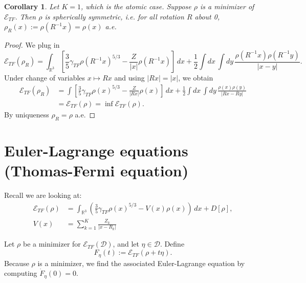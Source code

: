 \documentclass[11pt]{amsart}
\newcommand{\R}{\mathbb{R}}
\newtheorem{cor}{Corollary}
\theoremstyle{definition}
\theoremstyle{definition}
\theoremstyle{definition}
\numberwithin{equation}{section}
\begin{document}
\begin{cor}
Let $K=1$, which is the atomic case. Suppose $\rho$ is a minimizer of $\mathcal{E}_{TF}$. Then $\rho$ is spherically symmetric, i.e. for all rotation $R$ about 0, $\rho_R(x):=\rho(R^{-1}x)=\rho(x)$ a.e.
\end{cor}
\begin{proof}
We plug in
\[
\mathcal{E}_{TF}(\rho_R)=\int_{\R^3}\left[\frac{3}{5}\gamma_{TF}\rho(R^{-1}x)^{5/3}-\frac{Z}{|x|}\rho(R^{-1}x)\right]\,dx+\frac{1}{2}\int dx\,\int dy\,\frac{\rho(R^{-1}x)\rho(R^{-1}y)}{|x-y|}.
\]
Under change of variables $x\mapsto Rx$ and using $|Rx|=|x|$, we obtain
\begin{align*}
\mathcal{E}_{TF}(\rho_R)&=\int\left[\frac{3}{5}\gamma_{TF}\rho(x)^{5/3}-\frac{Z}{|Rx|}\rho(x)\right]\,dx+\frac{1}{2}\int dx\,\int dy\,\frac{\rho(x)\rho(y)}{|Rx-Ry|}\\
&=\mathcal{E}_{TF}(\rho)=\inf\mathcal{E}_{TF}(\rho).
\end{align*}
By uniqueness $\rho_R=\rho$ a.e.
\end{proof}

\section{Euler-Lagrange equations (Thomas-Fermi equation)}
Recall we are looking at:
\begin{align*}
\nonumber\mathcal{E}_{TF}(\rho)&=\int_{\R^3}\left(\frac{3}{5}\gamma_{TF}\rho(x)^{5/3}-V(x)\rho(x)\right)\,dx+D[\rho],\\
V(x)&=\sum_{k=1}^K\frac{Z_k}{|x-R_k|}
\end{align*}


Let $\rho$ be a minimizer for $\mathcal{E}_{TF}(\mathcal{D})$, and let $\eta\in\mathcal{D}$. Define
\[
F_\eta(t):=\mathcal{E}_{TF}(\rho+t\eta).
\]
Because $\rho$ is a minimizer, we find the associated Euler-Lagrange equation by computing $\dot{F}_\eta(0)=0$. 
\end{document}
